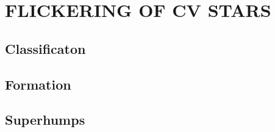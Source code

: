 \chapter{FLICKERING OF CV STARS}
\thispagestyle{empty}

\mquote{}{}

\section{Classificaton}

\section{Formation}

\section{Superhumps}




